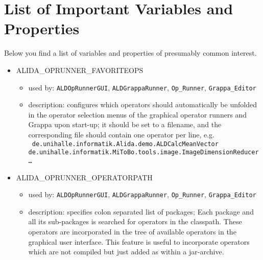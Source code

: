 \section{List of Important Variables and Properties}
\label{sec:importantVars}
Below you find a list of variables and properties of presumably common interest.
\begin{itemize}
\item ALIDA\_OPRUNNER\_FAVORITEOPS
	\begin{itemize}
	    \item used by: {\tt ALDOpRunnerGUI}, {\tt ALDGrappaRunner}, {\tt Op\_Runner}, {\tt Grappa\_Editor}
	    \item description: configures which operators should automatically be unfolded in the operator selection menus of the 
	    	graphical operator runners and Grappa upon start-up; it should be set to a filename, and the corresponding file should 
	    	contain one operator per line, e.g.\\
	    	{\tt 
				de.unihalle.informatik.Alida.demo.ALDCalcMeanVector\\
				de.unihalle.informatik.MiToBo.tools.image.ImageDimensionReducer\\
				\ldots
				}
	\end{itemize}
\item ALIDA\_OPRUNNER\_OPERATORPATH
        \begin{itemize}
            \item used by: {\tt ALDOpRunnerGUI}, {\tt ALDGrappaRunner}, {\tt Op\_Runner}, {\tt Grappa\_Editor}
		\item	description: specifies colon separated list of packages; 
        Each package and all its sub-packages 
        is searched for operators in the classpath.
        These operators are incorporated in the tree of available operators
        in the graphical user interface.
        This feature is useful to incorporate operators which are not compiled
        but just added as within a jar-archive.
	\end{itemize}


\end{itemize}
